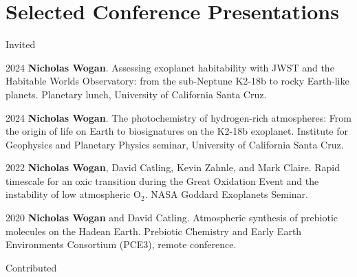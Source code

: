 \documentclass{article}
\begin{document}
\section{Selected Conference Presentations}

\noindent Invited

\begin{cvlist}
\item[2024]
  \textbf{Nicholas Wogan}. Assessing exoplanet habitability with JWST and the Habitable Worlds Observatory: from the sub-Neptune K2-18b to rocky Earth-like planets. Planetary lunch, University of California Santa Cruz.
\item[2024]
  \textbf{Nicholas Wogan}. The photochemistry of hydrogen-rich atmospheres: From the origin of life on Earth to biosignatures on the K2-18b exoplanet. Institute for Geophysics and Planetary Physics seminar, University of California Santa Cruz.
\item[2022]
  \textbf{Nicholas Wogan}, David Catling, Kevin Zahnle, and Mark Claire. Rapid timescale for an oxic transition during the Great Oxidation Event and the instability of low atmospheric O$_2$. NASA Goddard Exoplanets Seminar.
\item[2020] 
  \textbf{Nicholas Wogan} and David Catling. Atmospheric synthesis of prebiotic molecules on the Hadean Earth. Prebiotic Chemistry and Early Earth Environments Consortium (PCE3), remote conference.
\end{cvlist}

\noindent Contributed
\end{document}
